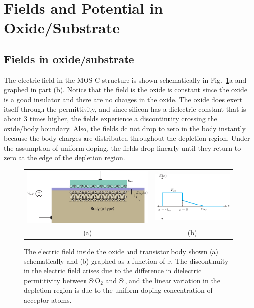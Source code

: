 \section{Fields and Potential in Oxide/Substrate}
\subsection{Fields in oxide/substrate}
The electric field in the MOS-C structure is shown schematically in Fig.~\ref{fig:mos_field_oxide_semi}a and graphed in part (b).  Notice that the field is the oxide is constant since the oxide is a good insulator and there are no charges in the oxide.  The oxide does exert itself through the permittivity, and since silicon has a dielectric constant that is about 3 times higher, the fields experience a discontinuity crossing the oxide/body boundary.  Also, the fields do not drop to zero in the body instantly because the body charges are distributed throughout the depletion region.  Under the assumption of uniform doping, the fields drop linearly until they return to zero at the edge of the depletion region.   
\begin{figure}[tbh]
\begin{center}
\begin{tabular}{cc}
\includegraphics[width=.6\columnwidth]{mos_cap_Efields} &
\includegraphics[width=.4\columnwidth]{MOS_E_field} \\
(a) & (b) \\
\end{tabular}
\end{center}
\caption{The electric field inside the oxide and transistor body shown (a) schematically and (b) graphed as a function of $x$.  The discontinuity in the electric field arises due to the difference in dielectric permittivity between SiO$_2$ and Si, and the linear variation in the depletion region is due to the uniform doping concentration of acceptor atoms.}
\label{fig:mos_field_oxide_semi}
\end{figure}
